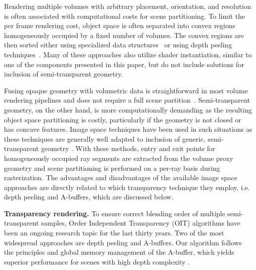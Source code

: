 \documentclass{egpubl}
\newcommand{\ab}{\mbox{A-buffer}}
\begin{document}
Rendering multiple volumes with arbitrary placement, orientation, and resolution is often associated with computational costs for scene partitioning. 
To limit the per frame rendering cost, object space is often separated into convex regions homogeneously occupied by a fixed number of volumes. 
The convex regions are then sorted either using specialized data structures~\cite{grimm04vobjects,lindholm2009fused,Lux2009} or using depth peeling techniques~\cite{Plate2007,rossler08multishader}. 
Many of these approaches also utilize shader instantiation, similar to one of the components presented in this paper, but do not include solutions for inclusion of semi-transparent geometry. 

Fusing opaque geometry with volumetric data is straightforward in most volume rendering pipelines and does not require a full scene partition~\cite{engel2006volume}. 
Semi-transparent geometry, on the other hand, is more computationally demanding as the resulting object space partitioning is costly, particularly if the geometry is not closed or has concave features. 
Image space techniques have been used in such situations as these techniques are generally well adapted to inclusion of generic, semi-transparent geometry \cite{brecheisen08multimodal,kainz2009ray}. 
With these methods, entry and exit points for homogeneously occupied ray segments are extracted from the volume proxy geometry and scene partitioning is performed on a per-ray basis during rasterization.
The advantages and disadvantages of the available image space approaches are directly related to which transparency technique they employ, i.e. depth peeling and \ab{}s, which are discussed below. 


\noindent\textbf{Transparency rendering.}
%
To ensure correct blending order of multiple semi-transparent samples, Order Independent Transparency (OIT) algorithms have been an ongoing research topic for the last thirty years.
Two of the most widespread approaches are depth peeling and \ab{}s. 
Our algorithm follows the principles and global memory management of the \ab{}, which yields superior performance for scenes with high depth complexity \cite{Yang2010,Kauker2013}. 
\end{document}
